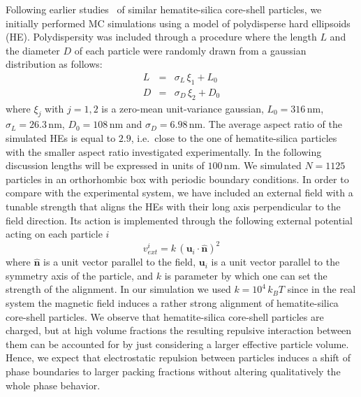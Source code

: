 \documentclass[aps,prl,preprint,superscriptaddress,showkeys]{revtex4-2} %
\def\nm{\,\si{\nano\meter}}%
\begin{document}
Following earlier studies~\cite{martchenko2016anisotropic} of similar hematite-silica core-shell particles, we initially performed MC simulations
using a model of polydisperse hard ellipsoids (HE). Polydispersity was included through a procedure where the length $L$ and the diameter $D$ of each particle were randomly drawn from a gaussian distribution as follows:
\begin{eqnarray}
  L &=& \sigma_L\,\xi_1 + L_0\\
  D &=& \sigma_D\,\xi_2 + D_0
\end{eqnarray}
where $\xi_j$ with $j=1,2$ is a zero-mean unit-variance gaussian, $L_0=316 \nm$, $\sigma_L=26.3 \nm$, $D_0=108 \nm$ and $\sigma_D=6.98 \nm$. The average aspect ratio of the simulated HEs is equal to $2.9$, i.e.~close to the one of hematite-silica particles with the smaller aspect ratio investigated experimentally. In the following discussion lengths will be expressed in units of $100\nm$. We simulated $N=1125$ particles in an orthorhombic box with periodic boundary conditions. In order to compare with the experimental system, we have included an external field with a tunable strength that aligns the HEs with their long axis perpendicular to the field direction. Its action is implemented through the following external potential acting on each particle $i$
\begin{equation}
v_{ext}^i = k\, {( \mathbf{u}_i\cdot \hat{\mathbf{n}} )}^2
\end{equation}
where $\hat{\mathbf{n}}$ is a unit vector parallel to the field, $\mathbf{u}_i$ is a unit vector parallel to the symmetry axis of the particle, and $k$ is parameter by which one can set the strength of the alignment. In our simulation we used $k=10^4\, k_B T$ since in the real system the magnetic field induces a rather strong alignment of hematite-silica core-shell particles. We observe that hematite-silica core-shell particles are charged, but at high volume fractions the resulting repulsive interaction between them can be accounted for by just considering a larger effective particle volume. Hence, we expect that electrostatic repulsion between particles  induces a shift of phase boundaries to larger packing fractions without altering qualitatively the whole phase behavior.\par
\end{document}
